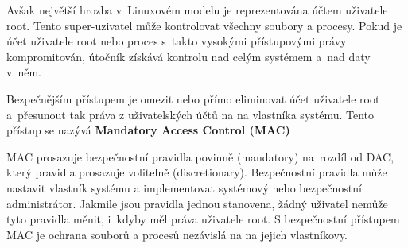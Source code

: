 \documentclass[a4paper,12pt]{article}
\renewcommand{\b}[1]{\textbf{#1}} %
\begin{document}

Avšak největší hrozba v~Linuxovém modelu je reprezentována účtem uživatele root. Tento super-uzivatel může kontrolovat všechny soubory a procesy. Pokud je účet uživatele root nebo proces s~takto vysokými přístupovými právy kompromitován, útočník získává kontrolu nad celým systémem a~nad daty v~něm.~\cite{Linux_com_MACvsDAC}
 

Bezpečnějším přístupem je omezit nebo přímo eliminovat účet uživatele root a~přesunout tak práva z uživatelských účtů na na vlastníka systému\footnotemark[1]. Tento přístup se nazývá \b{Mandatory Access Control (MAC)}~\cite{Linux_com_MACvsDAC}


MAC prosazuje bezpečnostní pravidla povinně (mandatory) na~rozdíl od DAC, který pravidla prosazuje volitelně (discretionary). Bezpečnostní pravidla může nastavit vlastník systému a implementovat systémový nebo bezpečnostní administrátor. Jakmile jsou pravidla jednou stanovena, žádný uživatel nemůže tyto pravidla měnit, i~kdyby měl práva uživatele root. S bezpečnostní přístupem MAC je ochrana souborů a procesů nezávislá na na jejich vlastníkovy.~\cite{Linux_com_MACvsDAC}


\end{document}
